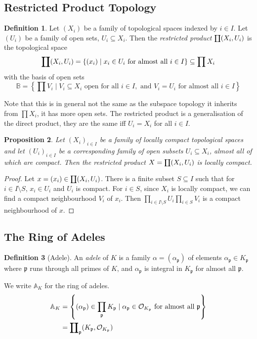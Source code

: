 \documentclass[11pt]{article}
\theoremstyle{definition}
\newtheorem{definition}{Definition}[section]
\theoremstyle{plain}
\newtheorem{proposition}[definition]{Proposition}
\theoremstyle{remark}
\newcommand{\bA}{\mathbb{A}}
\newcommand{\cO}{\mathcal{O}}
\newcommand{\fp}{\mathfrak{p}}
\newcommand{\rprod}{\mathrlap{\prod}{\coprod}}
\begin{document}
\subsection{Restricted Product Topology}

\begin{definition}\label{def:9_1}
    Let $(X_i)$ be a family of topological spaces indexed by $i \in I$. Let $(U_i)$ be a family of open sets, $U_i \subseteq X_i$. Then the \emph{restricted product} $\rprod (X_i, U_i)$ is the topological space
    \begin{equation*}
        \rprod(X_i, U_i) = \{(x_i) \mid x_i \in U_i \text{ for almost all } i \in I\} \subseteq \prod X_i
    \end{equation*}
    with the basis of open sets
    \begin{equation*}
        \mathbb{B} = \left\{\prod V_i \mid V_i \subseteq X_i \text{ open for all } i \in I, \text{ and } V_i = U_i \text{ for almost all } i \in I\right\}
    \end{equation*}
\end{definition}
Note that this is in general not the same as the subspace topology it inherits from $\prod X_i$, it has more open sets. The restricted product is a generalisation of the direct product, they are the same iff $U_i = X_i$ for all $i \in I$.

\begin{proposition}\label{prop:9_2}
    Let $(X_i)_{i \in I}$ be a family of locally compact topological spaces and let $(U_i)_{i \in I}$ be a corresponding family of open subsets $U_i \subseteq X_i$, almost all of which are compact. Then the restricted product $X = \rprod(X_i, U_i)$ is locally compact.
\end{proposition}
\begin{proof}\color{blue}
    Let $x = (x_i) \in \rprod(X_i, U_i)$. There is a finite subset $S \subseteq I$ such that for $i \in I \setminus S$, $x_i \in U_i$ and $U_i$ is compact. For $i \in S$, since $X_i$ is locally compact, we can find a compact neighbourhood $V_i$ of $x_i$. Then $\prod_{i \in I \setminus S} U_i \prod_{i \in S} V_i$ is a compact neighbourhood of $x$.
\end{proof}

\subsection{The Ring of Adeles}

\begin{definition}[Adele]\label{def:9_3} An \emph{adele} of $K$ is a family $\alpha = (\alpha_\fp)$ of elements $\alpha_\fp \in K_\fp$ where $\fp$ runs through all primes of $K$, and $\alpha_\fp$ is integral in $K_\fp$ for almost all $\fp$.
\end{definition}
We write $\bA_K$ for the ring of adeles.
\begin{align*}
    \bA_K
    &= \left\{(\alpha_\fp) \in \prod_{\fp} K_\fp \mid \alpha_\fp \in \cO_{K_\fp} \text{ for almost all } \fp\right\}\\
    &= \rprod_{\fp} (K_\fp, \cO_{K_\fp})
\end{align*}
\end{document}
